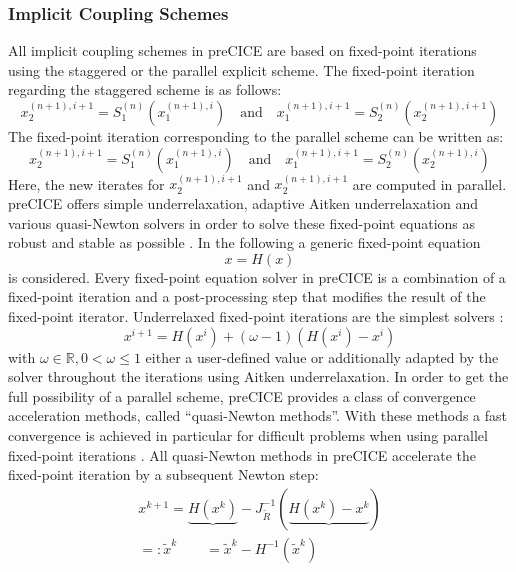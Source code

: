   \subsubsection{Implicit Coupling Schemes}\label{sec:Coupl-Coupling-Implicit}
   All implicit coupling schemes in preCICE are based on fixed-point iterations using the staggered or the parallel explicit scheme. The fixed-point iteration regarding the staggered scheme is as follows:
   \begin{equation}
   x_2^{(n+1),i+1} = S_1^{(n)}\left( x_1^{(n+1),i} \right)\quad \text{and}\quad x_1^{(n+1),i+1} = S_2^{(n)}\left( x_2^{(n+1),i+1} \right)
   \end{equation}
   The fixed-point iteration corresponding to the parallel scheme can be written as:
   \begin{equation}
   x_2^{(n+1),i+1} = S_1^{(n)}\left( x_1^{(n+1),i} \right)\quad \text{and}\quad x_1^{(n+1),i+1} = S_2^{(n)}\left( x_2^{(n+1),i} \right)
   \end{equation}
   Here, the new iterates for $x_2^{(n+1),i+1}$ and $x_2^{(n+1),i+1}$ are computed in parallel. preCICE offers simple underrelaxation, adaptive Aitken underrelaxation and various quasi-Newton solvers in order to solve these fixed-point equations as robust and stable as possible \cite{bungartz2015fully}. In the following a generic fixed-point equation
   \begin{equation}\label{eq:fixed-point-eq}
   x = H(x)
   \end{equation}
   is considered. Every fixed-point equation solver in preCICE is a combination of a fixed-point iteration and a post-processing step that modifies the result of the fixed-point iterator. Underrelaxed fixed-point iterations are the simplest solvers \cite{bungartz2015fully}:
   \begin{equation}
   x^{i+1} = H(x^i)+(\omega - 1)\left( H(x^i) - x^i\right)
   \end{equation}
   with $\omega \in \mathbb{R}, 0 < \omega \leq 1$ either a user-defined value or additionally adapted by the solver throughout the iterations using Aitken underrelaxation.
   In order to get the full possibility of a parallel scheme, preCICE provides a class of convergence acceleration methods, called ``quasi-Newton methods''. With these methods a fast convergence is achieved in particular for difficult problems when using parallel fixed-point iterations \cite{bungartz2015fully}. All quasi-Newton methods in preCICE accelerate the fixed-point iteration by a subsequent Newton step:
   \begin{align}
   x^{k+1} = \underbrace{H(x^k)} - J_{\tilde{R}}^{-1}\left( \underbrace{H(x^k) - x^k}\right) \\
   =: \tilde{x}^k\qquad =\tilde{x}^k - H^{-1}(\tilde{x}^k) \nonumber
   \end{align}
